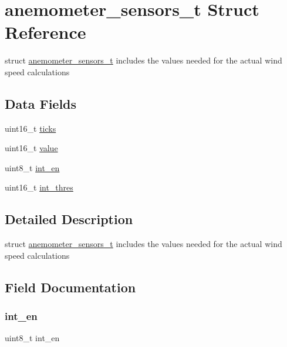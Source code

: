 \hypertarget{structanemometer__sensors__t}{}\section{anemometer\+\_\+sensors\+\_\+t Struct Reference}
\label{structanemometer__sensors__t}


struct \mbox{\hyperlink{structanemometer__sensors__t}{anemometer\+\_\+sensors\+\_\+t}} includes the values needed for the actual wind speed calculations  


\subsection*{Data Fields}
\begin{DoxyCompactItemize}
\item 
uint16\+\_\+t \mbox{\hyperlink{structanemometer__sensors__t_a633f87461ad14b25bca192cdf65d1604}{ticks}}
\item 
uint16\+\_\+t \mbox{\hyperlink{structanemometer__sensors__t_a900b69af7d674b8db3bceae754b4955a}{value}}
\item 
uint8\+\_\+t \mbox{\hyperlink{structanemometer__sensors__t_afabd1883499030ed1484195763c771dc}{int\+\_\+en}}
\item 
uint16\+\_\+t \mbox{\hyperlink{structanemometer__sensors__t_aa9e9c93852b6dee7a02768af61ec4848}{int\+\_\+thres}}
\end{DoxyCompactItemize}


\subsection{Detailed Description}
struct \mbox{\hyperlink{structanemometer__sensors__t}{anemometer\+\_\+sensors\+\_\+t}} includes the values needed for the actual wind speed calculations 



\subsection{Field Documentation}
\mbox{\label{structanemometer__sensors__t_afabd1883499030ed1484195763c771dc}} 
\subsubsection{\texorpdfstring{int\_en}{int\_en}}
{\footnotesize\ttfamily uint8\+\_\+t int\+\_\+en}

